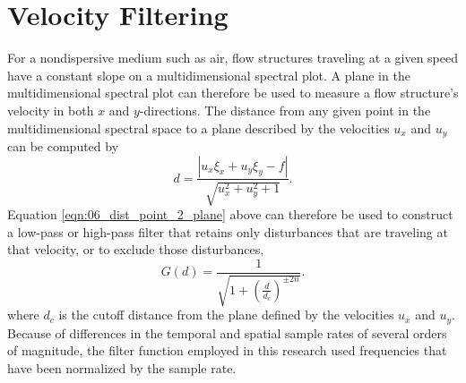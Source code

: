 \section{Velocity Filtering}
\label{chap:06_velocity_filter}
For a nondispersive medium such as air, flow structures traveling at a given speed have a constant slope on a multidimensional spectral plot.
A plane in the multidimensional spectral plot can therefore be used to measure a flow structure's velocity in both $x$ and $y$-directions.
The distance from any given point in the multidimensional spectral space to a plane described by the velocities $u_x$ and $u_y$ can be computed by
\begin{equation}
 d = \frac{|u_x\xi_x+u_y\xi_y-f|}{\sqrt{u_x^2+u_y^2+1}} \textrm{.}
 \label{eqn:06_dist_point_2_plane}
\end{equation}
Equation \ref{eqn:06_dist_point_2_plane} above can therefore be used to construct a low-pass or high-pass filter that retains only disturbances that are traveling at that velocity, or to exclude those disturbances,
\begin{equation}
  G(d) = \frac{1}{\sqrt{1+\left(\frac{d}{d_c}\right)^{\pm2n}}} \textrm{.}
  \label{eqn:06_butterworth_velocity}
\end{equation}
where $d_c$ is the cutoff distance from the plane defined by the velocities $u_x$ and $u_y$.
Because of differences in the temporal and spatial sample rates of several orders of magnitude, the filter function employed in this research used frequencies that have been normalized by the sample rate.

